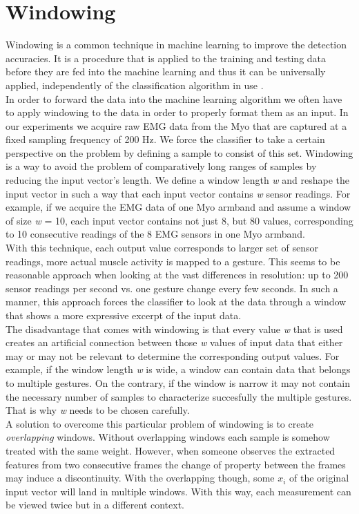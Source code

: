 \section{Windowing}
Windowing is a common technique in machine learning to improve the detection accuracies. It is a procedure that is applied to the training and testing data before they are fed into the machine learning and thus it can be universally applied, independently of the  classification algorithm  in use  \cite{dietterich_machine_2002}. \\
In order to forward the data into the machine learning algorithm we often have to apply windowing to the data in order to properly format them as an input. In our experiments we acquire raw EMG data from the Myo that are captured at a fixed sampling frequency of 200 Hz. We force the classifier to take a certain perspective on the problem by defining a sample to consist of this set. 
Windowing is a way to avoid the problem of comparatively long ranges of samples by reducing the input vector's length. We define a window length \textit{w} and reshape the input vector in such a way that each input vector contains \textit{w} sensor readings. For example, if we acquire the EMG data of one Myo armband and assume a window of size \textit{w} = 10, each input vector contains not just 8, but 80 values, corresponding to 10 consecutive readings of the 8 EMG sensors in one Myo armband.\\
With this technique, each output value corresponds to larger set of sensor readings, more actual muscle activity is mapped to a gesture. This seems to be reasonable approach when looking at the vast differences in resolution: up to 200 sensor readings per second vs. one gesture change every few seconds. In such a manner, this approach forces the classifier to look at the data through a window that shows a more expressive excerpt of the input data.\\
The disadvantage that comes with windowing is that every value \textit{w} that is used creates an artificial connection between those \textit{w} values of input data that either may or may not be relevant to determine the corresponding output values. For example, if the window length \textit{w} is wide, a window can contain data that belongs to multiple gestures. On the contrary, if the window is narrow it may not contain the necessary number of samples to characterize succesfully the multiple gestures. That is why \textit{w} needs to be chosen carefully.\\
A solution to overcome this particular problem of windowing is to create \textit{overlapping} windows. Without overlapping windows each sample is somehow treated with the same weight. However, when someone observes the extracted features from two consecutive frames the change of property between the frames may induce a discontinuity. With the overlapping though, some $x_i$ of the original input vector will land in multiple windows. With this way, each measurement can be viewed twice but in a different context.\\
